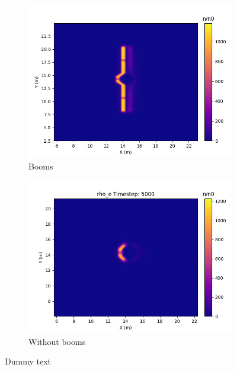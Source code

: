 \begin{center}
    \begin{figure}[H]
      \begin{subfigure}[b]{0.61\textwidth}
      \includegraphics[width=\textwidth]{figures/MMO/plusX/Booms/BoomsPlusXrhoET5000.png}
      \caption{Booms}
      \label{fig:PhiXBoomsPlusX}
    \end{subfigure}
    \begin{subfigure}[b]{0.61\textwidth}
      \includegraphics[width=\textwidth]{figures/MMO/plusX/noBooms/noBoomsPlusXrhoET5000.png}
      \caption{Without booms}
      \label{fig:PhiXnoBoomsPlusX}
    \end{subfigure}
  \label{fig:PhiXDriftX}
  \caption{Dummy text}
  \end{figure}
\end{center}




